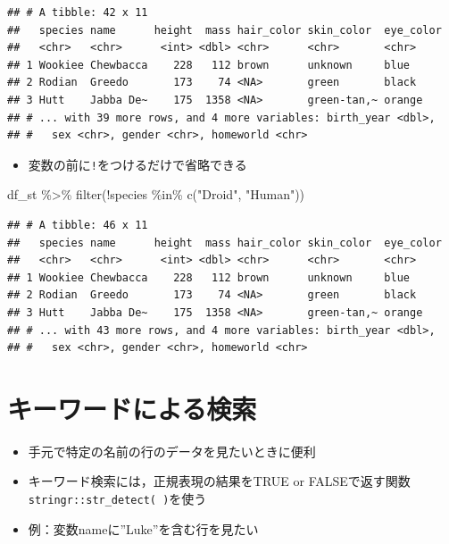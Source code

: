 \documentclass[
  xelatex,ja=standard, b5paper]{bxjsbook}
\newenvironment{Shaded}{\begin{snugshade}}{\end{snugshade}}
\newcommand{\FunctionTok}[1]{\textcolor[rgb]{0.00,0.00,0.00}{#1}}
\newcommand{\NormalTok}[1]{#1}
\newcommand{\SpecialCharTok}[1]{\textcolor[rgb]{0.00,0.00,0.00}{#1}}
\newcommand{\StringTok}[1]{\textcolor[rgb]{0.31,0.60,0.02}{#1}}
\providecommand{\tightlist}{%
  \setlength{\itemsep}{0pt}\setlength{\parskip}{0pt}}
\begin{document}
\begin{verbatim}
## # A tibble: 42 x 11
##   species name      height  mass hair_color skin_color  eye_color
##   <chr>   <chr>      <int> <dbl> <chr>      <chr>       <chr>    
## 1 Wookiee Chewbacca    228   112 brown      unknown     blue     
## 2 Rodian  Greedo       173    74 <NA>       green       black    
## 3 Hutt    Jabba De~    175  1358 <NA>       green-tan,~ orange   
## # ... with 39 more rows, and 4 more variables: birth_year <dbl>,
## #   sex <chr>, gender <chr>, homeworld <chr>
\end{verbatim}

\begin{itemize}
\tightlist
\item
  変数の前に\texttt{!}をつけるだけで省略できる
\end{itemize}

\begin{Shaded}
\begin{Highlighting}[]
\NormalTok{df\_st }\SpecialCharTok{\%\textgreater{}\%} 
  \FunctionTok{filter}\NormalTok{(}\SpecialCharTok{!}\NormalTok{species }\SpecialCharTok{\%in\%} \FunctionTok{c}\NormalTok{(}\StringTok{"Droid"}\NormalTok{, }\StringTok{"Human"}\NormalTok{))}
\end{Highlighting}
\end{Shaded}

\begin{verbatim}
## # A tibble: 46 x 11
##   species name      height  mass hair_color skin_color  eye_color
##   <chr>   <chr>      <int> <dbl> <chr>      <chr>       <chr>    
## 1 Wookiee Chewbacca    228   112 brown      unknown     blue     
## 2 Rodian  Greedo       173    74 <NA>       green       black    
## 3 Hutt    Jabba De~    175  1358 <NA>       green-tan,~ orange   
## # ... with 43 more rows, and 4 more variables: birth_year <dbl>,
## #   sex <chr>, gender <chr>, homeworld <chr>
\end{verbatim}

\hypertarget{filter-kw}{%
\section{キーワードによる検索}\label{filter-kw}}

\begin{itemize}
\item
  手元で特定の名前の行のデータを見たいときに便利
\item
  キーワード検索には，正規表現の結果をTRUE or FALSEで返す関数\texttt{stringr::str\_detect(\ )}を使う
\item
  例：変数nameに''Luke''を含む行を見たい
\end{itemize}
\end{document}
